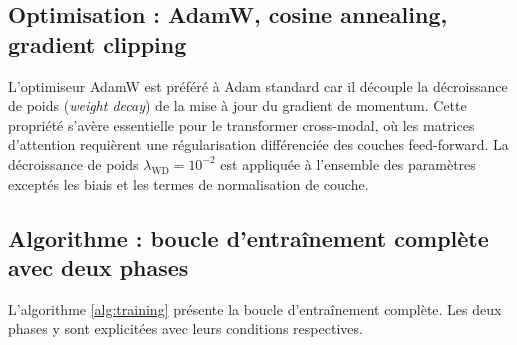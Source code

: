 \documentclass[12pt,a4paper]{report}
\begin{document}
\subsection{Optimisation : AdamW, cosine annealing, gradient clipping}

L'optimiseur AdamW \cite{loshchilov2018adamw} est pr\'{e}f\'{e}r\'{e} \`{a} Adam standard car il d\'{e}couple la d\'{e}croissance de poids (\emph{weight decay}) de la mise \`{a} jour du gradient de momentum. Cette propri\'{e}t\'{e} s'av\`{e}re essentielle pour le transformer cross-modal, o\`{u} les matrices d'attention requi\`{e}rent une r\'{e}gularisation diff\'{e}renci\'{e}e des couches feed-forward. La d\'{e}croissance de poids $\lambda_{\text{WD}} = 10^{-2}$ est appliqu\'{e}e \`{a} l'ensemble des param\`{e}tres except\'{e}s les biais et les termes de normalisation de couche.

\subsection{Algorithme : boucle d'entra\^{i}nement compl\`{e}te avec deux phases}

L'algorithme \ref{alg:training} pr\'{e}sente la boucle d'entra\^{i}nement compl\`{e}te. Les deux phases y sont explicit\'{e}es avec leurs conditions respectives.
\end{document}
